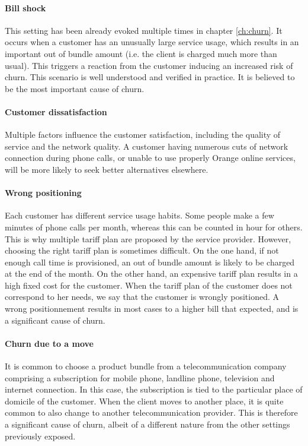 \paragraph{Bill shock} This setting has been already evoked multiple times in
chapter \ref{ch:churn}. It occurs when a customer has an unusually large
service usage, which results in an important out of bundle amount (i.e. the
client is charged much more than usual). This triggers a reaction from the
customer inducing an increased risk of churn. This scenario is well understood
and verified in practice. It is believed to be the most important cause of
churn.

\paragraph{Customer dissatisfaction} Multiple factors influence the customer
satisfaction, including the quality of service and the network quality. A
customer having numerous cuts of network connection during phone calls, or
unable to use properly Orange online services, will be more likely to seek
better alternatives elsewhere.

\paragraph{Wrong positioning} Each customer has different service usage habits.
Some people make a few minutes of phone calls per month, whereas this can be
counted in hour for others. This is why multiple tariff plan are proposed by the
service provider. However, choosing the right tariff plan is sometimes
difficult. On the one hand, if not enough call time is provisioned, an out of
bundle amount is likely to be charged at the end of the month. On the other
hand, an expensive tariff plan results in a high fixed cost for the customer.
When the tariff plan of the customer does not correspond to her needs, we say
that the customer is wrongly positioned. A wrong positionnement results in most
cases to a higher bill that expected, and is a significant cause of churn.

\paragraph{Churn due to a move} It is common to choose a product bundle from a
telecommunication company comprising a subscription for mobile phone, landline
phone, television and internet connection. In this case, the subscription is
tied to the particular place of domicile of the customer. When the client moves
to another place, it is quite common to also change to another telecommunication
provider. This is therefore a significant cause of churn, albeit of a different
nature from the other settings previously exposed.


